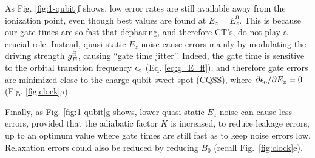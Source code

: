 \documentclass[aps,prb,superscriptaddress,nobibnotes,twocolumn]{revtex4-1}
\begin{document}
As Fig. \ref{fig:1-qubit}f shows, low error rates are still available away from the ionization point, even though best values are found at $E_z=E_z^0$. This is because our gate times are so fast that dephasing, and therefore CT's, do not play a crucial role. Instead, quasi-static $E_z$ noise cause errors mainly by modulating the driving strength $g_E^{\rm ff}$, causing ``gate time jitter''. Indeed, the gate time is sensitive to the orbital transition frequency $\epsilon_{\rm o}$ (Eq. \ref{eq:g_E_ff}), and therefore gate errors are minimized close to the charge qubit sweet spot (CQSS), where $\partial\epsilon_{\rm o}/\partial E_z=0$ (Fig. \ref{fig:clock}a).

Finally, as Fig. \ref{fig:1-qubit}g shows, lower quasi-static $E_z$ noise can cause less errors, provided that the adiabatic factor $K$ is increased, to reduce leakage errors, up to an optimum value where gate times are still fast as to keep noise errors low. Relaxation errors could also be reduced by reducing $B_0$ (recall Fig.~\ref{fig:clock}e).


\end{document}
